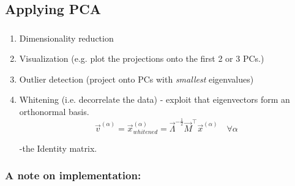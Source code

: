 \subsection{Applying PCA}



\begin{frame}\frametitle{\subsecname}

\begin{enumerate}
\item Dimensionality reduction
\item Visualization (e.g. plot the projections onto the first 2 or 3 PCs.)
\item Outlier detection (project onto PCs with \emph{smallest} eigenvalues)
\item Whitening (i.e. decorrelate the data) - exploit that eigenvectors form an orthonormal basis.
$$
\vec v^{(\alpha)} = \vec x_{whitened}^{(\alpha)} = \vec{\Lambda}^{-\frac{1}{2}}\vec{M}^\top\vec{x}^{(\alpha)}
\quad
\forall \alpha
$$


\pause

-the Identity matrix.

\end{enumerate}

\end{frame}

\newpage


\subsubsection{A note on implementation:}

